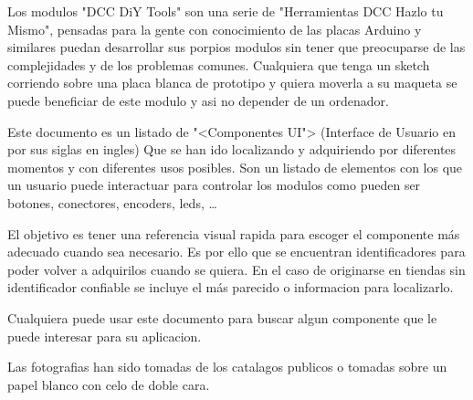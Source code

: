 
Los modulos "DCC DiY Tools" son una serie de "Herramientas DCC Hazlo tu Mismo", pensadas para la gente con conocimiento de las placas Arduino y similares
puedan desarrollar sus porpios modulos sin tener que preocuparse de las complejidades y de los problemas comunes. Cualquiera que tenga un sketch corriendo
sobre una placa blanca de prototipo y quiera moverla a su maqueta se puede beneficiar de este modulo y asi no depender de un ordenador. 

Este documento es un listado de "<Componentes UI"> (Interface de Usuario en por sus siglas en ingles)
Que se han ido localizando y adquiriendo por diferentes momentos y con diferentes usos posibles.
Son un listado de elementos con los que un usuario puede interactuar para controlar los modulos como
pueden ser botones, conectores, encoders, leds, \dots

El objetivo es tener una referencia visual rapida para escoger el componente más adecuado cuando sea
necesario. Es por ello que se encuentran identificadores para poder volver a adquirilos cuando se
quiera. En el caso de originarse en tiendas sin identificador confiable se incluye el más parecido o informacion para localizarlo.


Cualquiera puede usar este documento para buscar algun componente que le puede interesar
para su aplicacion.

Las fotografias han sido tomadas de los catalagos publicos o tomadas sobre un papel blanco con celo
de doble cara.
